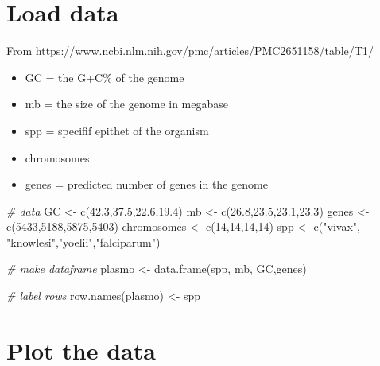 \documentclass[
]{book}
\newenvironment{Shaded}{\begin{snugshade}}{\end{snugshade}}
\newcommand{\CommentTok}[1]{\textcolor[rgb]{0.56,0.35,0.01}{\textit{#1}}}
\newcommand{\DecValTok}[1]{\textcolor[rgb]{0.00,0.00,0.81}{#1}}
\newcommand{\FloatTok}[1]{\textcolor[rgb]{0.00,0.00,0.81}{#1}}
\newcommand{\FunctionTok}[1]{\textcolor[rgb]{0.00,0.00,0.00}{#1}}
\newcommand{\NormalTok}[1]{#1}
\newcommand{\OtherTok}[1]{\textcolor[rgb]{0.56,0.35,0.01}{#1}}
\newcommand{\StringTok}[1]{\textcolor[rgb]{0.31,0.60,0.02}{#1}}
\providecommand{\tightlist}{%
  \setlength{\itemsep}{0pt}\setlength{\parskip}{0pt}}
\begin{document}
\hypertarget{load-data-7}{%
\section{Load data}\label{load-data-7}}

From \url{https://www.ncbi.nlm.nih.gov/pmc/articles/PMC2651158/table/T1/}

\begin{itemize}
\tightlist
\item
  GC = the G+C\% of the genome
\item
  mb = the size of the genome in megabase
\item
  spp = specifif epithet of the organism
\item
  chromosomes
\item
  genes = predicted number of genes in the genome
\end{itemize}

\begin{Shaded}
\begin{Highlighting}[]
\CommentTok{\# data}
\NormalTok{GC }\OtherTok{\textless{}{-}} \FunctionTok{c}\NormalTok{(}\FloatTok{42.3}\NormalTok{,}\FloatTok{37.5}\NormalTok{,}\FloatTok{22.6}\NormalTok{,}\FloatTok{19.4}\NormalTok{)}
\NormalTok{mb }\OtherTok{\textless{}{-}} \FunctionTok{c}\NormalTok{(}\FloatTok{26.8}\NormalTok{,}\FloatTok{23.5}\NormalTok{,}\FloatTok{23.1}\NormalTok{,}\FloatTok{23.3}\NormalTok{)}
\NormalTok{genes }\OtherTok{\textless{}{-}} \FunctionTok{c}\NormalTok{(}\DecValTok{5433}\NormalTok{,}\DecValTok{5188}\NormalTok{,}\DecValTok{5875}\NormalTok{,}\DecValTok{5403}\NormalTok{)}
\NormalTok{chromosomes }\OtherTok{\textless{}{-}} \FunctionTok{c}\NormalTok{(}\DecValTok{14}\NormalTok{,}\DecValTok{14}\NormalTok{,}\DecValTok{14}\NormalTok{,}\DecValTok{14}\NormalTok{)}
\NormalTok{spp }\OtherTok{\textless{}{-}} \FunctionTok{c}\NormalTok{(}\StringTok{"vivax"}\NormalTok{, }\StringTok{"knowlesi"}\NormalTok{,}\StringTok{"yoelii"}\NormalTok{,}\StringTok{"falciparum"}\NormalTok{)}

\CommentTok{\# make dataframe}
\NormalTok{plasmo }\OtherTok{\textless{}{-}} \FunctionTok{data.frame}\NormalTok{(spp, mb, GC,genes)}

\CommentTok{\# label rows}
\FunctionTok{row.names}\NormalTok{(plasmo) }\OtherTok{\textless{}{-}}\NormalTok{ spp}
\end{Highlighting}
\end{Shaded}

\hypertarget{plot-the-data-1}{%
\section{Plot the data}\label{plot-the-data-1}}
\end{document}
